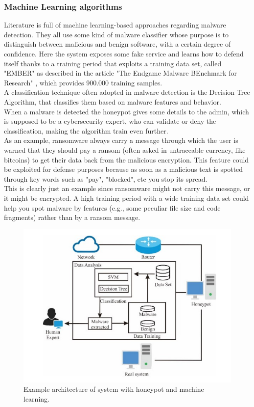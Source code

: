 \subsubsection{Machine Learning algorithms}
Literature is full of machine learning-based approaches regarding malware detection. They all use some kind of malware classifier whose purpose is to distinguish between malicious and benign software, with a certain degree of confidence. Here the system exposes some fake service and learns how to defend itself thanks to a training period that exploits a training data set, called "EMBER" as described in the article "The Endgame Malware BEnchmark for Research" \cite{https://doi.org/10.48550/arxiv.1804.04637}, which provides 900.000 training samples.\\
A classification technique often adopted in malware detection is the Decision Tree Algorithm, that classifies them based on malware features and behavior.\\
When a malware is detected the honeypot gives some details to the admin, which is supposed to be a cybersecurity expert, who can validate or deny the classification, making the algorithm train even further.\\
As an example, ransomware always carry a message through which the user is warned that they should pay a ransom (often asked in untraceable currency, like bitcoins) to get their data back from the malicious encryption.
This feature could be exploited for defense purposes because as soon as a malicious text is spotted through key words such as "pay", "blocked", etc you stop its spread.\\
This is clearly just an example since ransomware might not carry this message, or it might be encrypted. A high training period with a wide training data set could help you spot malware by features (e.g., some peculiar file size and code fragments) rather than by a ransom message.

\begin{figure}[h]
  \centering
  \includegraphics[width = 14cm]{images/machineLearning.jpg}
  \caption{ Example architecture of system with honeypot and machine learning.}
  \label{fig:irradiances}
\end{figure}
\FloatBarrier

\newpage

